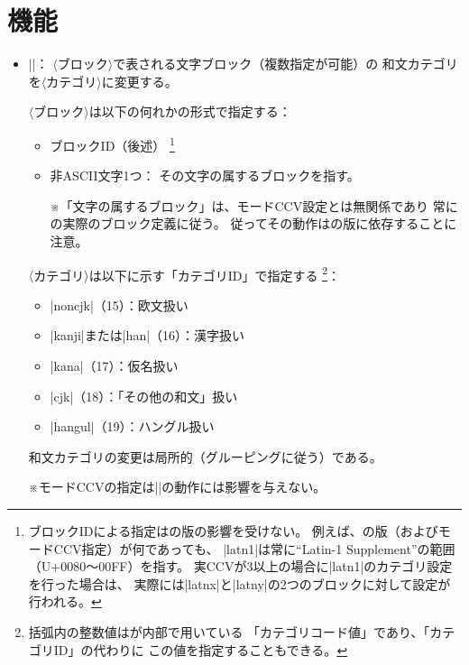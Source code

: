 \documentclass[uplatex,dvipdfmx,a4paper]{jsarticle}
\newcommand{\Meta}[1]{$\langle$\mbox{}#1\mbox{}$\rangle$}
\newcommand{\Note}{\par\noindent ※}
\newcommand{\Means}{：\quad}
\begin{document}
\section{機能}
\label{sec:Function}

\begin{itemize}
\item |\cjkcategory{|\Meta{ブロック}|,...}{|\Meta{カテゴリ}|}|\Means
  \Meta{ブロック}で表される文字ブロック（複数指定が可能）の
  和文カテゴリを\Meta{カテゴリ}に変更する。

  \Meta{ブロック}は以下の何れかの形式で指定する：
  \begin{itemize}
  \item ブロックID（後述）%
    \footnote{ブロックIDによる指定は{\upTeX}の版の影響を受けない。
      例えば、{\upTeX}の版（およびモードCCV指定）が何であっても、
      |latn1|は常に“Latin-1 Supplement”の範囲（U+0080～00FF）を指す。
      実CCVが3以上の場合に|latn1|のカテゴリ設定を行った場合は、
      実際には|latnx|と|latny|の2つのブロックに対して設定が行われる。}
  \item 非ASCII文字1つ\Means
    その文字の属するブロックを指す。
    \Note 「文字の属するブロック」は、モードCCV設定とは無関係であり
    常に{\upTeX}の実際のブロック定義に従う。
    従ってその動作は{\upTeX}の版に依存することに注意。
  \end{itemize}
  \Meta{カテゴリ}は以下に示す「カテゴリID」で指定する
    \footnote{括弧内の整数値は{\upTeX}が内部で用いている
      「カテゴリコード値」であり、「カテゴリID」の代わりに
      この値を指定することもできる。}：
  \begin{itemize}
  \item |noncjk|（15）\Means 欧文扱い
  \item |kanji|または|han|（16）\Means 漢字扱い
  \item |kana|（17）\Means 仮名扱い
  \item |cjk|（18）\Means \<「その他の和文」扱い
  \item |hangul|（19）\Means ハングル扱い
  \end{itemize}

  和文カテゴリの変更は局所的（グルーピングに従う）である。

  \Note モードCCVの指定は|\cjkcategory|の動作には影響を与えない。


\end{itemize}
\end{document}
